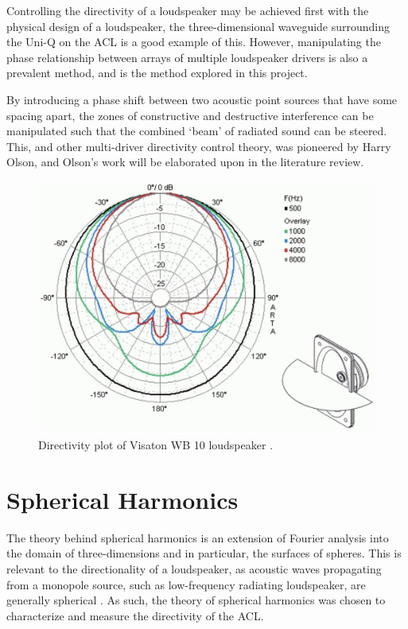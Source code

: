 \documentclass{report}
\begin{document}
        Controlling the directivity of a loudspeaker may be achieved first with the physical design of a loudspeaker, the three-dimensional waveguide surrounding the Uni-Q on the ACL is a good example of this.
        However, manipulating the phase relationship between arrays of multiple loudspeaker drivers is also a prevalent method, and is the method explored in this project.

        By introducing a phase shift between two acoustic point sources that have some spacing apart, the zones of constructive and destructive interference can be manipulated such that the combined `beam' of radiated sound can be steered.
        This, and other multi-driver directivity control theory, was pioneered by Harry Olson, and Olson's work will be elaborated upon in the literature review.

        \begin{figure}[H]
            \centering
            \hspace{2.5cm}\includegraphics[width = 0.7\linewidth]{figs/generalDirectivity.png}
            \caption{Directivity plot of Visaton WB 10 loudspeaker \cite{samarasinghe2016room}.}
        \end{figure}
        
        \newpage
        
    \section{Spherical Harmonics}
        The theory behind spherical harmonics is an extension of Fourier analysis into the domain of three-dimensions and in particular, the surfaces of spheres.
        This is relevant to the directionality of a loudspeaker, as acoustic waves propagating from a monopole source, such as low-frequency radiating loudspeaker, are generally spherical \cite{kinslerFreySpherical}.
        As such, the theory of spherical harmonics was chosen to characterize and measure the directivity of the ACL.
\end{document}
